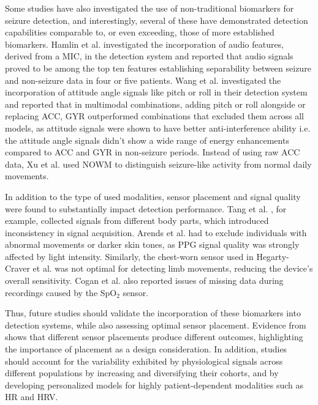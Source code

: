 Some studies have also investigated the use of non-traditional biomarkers for seizure detection, and interestingly, several of these have demonstrated detection capabilities comparable to, or even exceeding, those of more established biomarkers. Hamlin et al. \cite{Hamlin2021-sd} investigated the incorporation of audio features, derived from a MIC, in the detection system and reported that audio signals proved to be among the top ten features establishing separability between seizure and non-seizure data in four or five patients. Wang et al. \cite{Wang2025-ql} investigated the incorporation of attitude angle signals  like pitch or roll in their detection system and reported that in multimodal combinations, adding pitch or roll alongside or replacing ACC, GYR outperformed combinations that excluded them across all models, as attitude signals were shown to have better anti-interference ability i.e. the attitude angle signals didn’t show a wide range of energy enhancements compared to ACC and GYR in non-seizure periods.  Instead of using raw ACC data, Xu et al. \cite{Xu2022-tx} used NOWM to distinguish seizure-like activity from normal daily movements.

In addition to the type of used modalities, sensor placement and signal quality were found to substantially impact detection performance. Tang et al. \cite{Tang2021-td}, for example, collected signals from different body parts, which introduced inconsistency in signal acquisition. Arends et al. \cite{Arends2018-ew} had to exclude individuals with abnormal movements or darker skin tones, as PPG signal quality was strongly affected by light intensity. Similarly, the chest-worn sensor used in Hegarty-Craver et al. \cite{Hegarty-Craver2021-hk} was not optimal for detecting limb movements, reducing the device’s overall sensitivity. Cogan et al. \cite{Cogan2017-lg} also reported issues of missing data during recordings caused by the SpO$_2$ sensor.

Thus, future studies should validate the incorporation of these biomarkers into detection systems, while also assessing optimal sensor placement. Evidence from \cite{Milosevic2016-ee,De_Cooman2018-pq} shows that different sensor placements produce different outcomes, highlighting the importance of placement as a design consideration. In addition, studies should account for the variability exhibited by physiological signals across different populations by increasing and diversifying their cohorts, and by developing personalized models for highly patient-dependent modalities such as HR and HRV.

